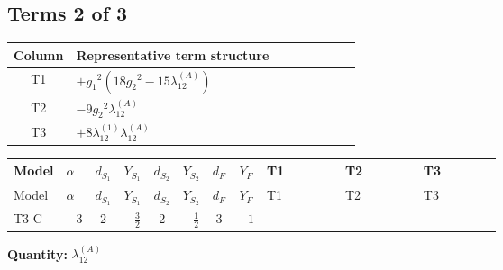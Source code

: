 \documentclass[8pt]{article}
\begin{document}
\begin{landscape}
\subsection*{Terms 2 of 3}
\begin{center}
\begin{tabular}{@{}c >{\raggedright\arraybackslash}p{0.82\linewidth}@{}}
\toprule
Column & Representative term structure \\
\midrule
T1 & \(\displaystyle +{g_1}^2 \left(18 {g_2}^2-15 {\lambda_{12}^{(A)}}\right)\) \\
\midrule
T2 & \(\displaystyle -9 {g_2}^2 {\lambda_{12}^{(A)}}\) \\
\midrule
T3 & \(\displaystyle +8 {\lambda_{12}^{(1)}} {\lambda_{12}^{(A)}}\) \\
\midrule
\bottomrule
\end{tabular}
\end{center}
\smallskip
\tiny
\begin{longtable}{@{}llcccccc >{\raggedright\arraybackslash}p{0.21\linewidth} >{\raggedright\arraybackslash}p{0.21\linewidth} >{\raggedright\arraybackslash}p{0.21\linewidth}@{}}
\toprule
Model & $\alpha$ & $d_{S_1}$ & $Y_{S_1}$ & $d_{S_2}$ & $Y_{S_2}$ & $d_F$ & $Y_F$ & T1 & T2 & T3 \\
\midrule
\endfirsthead
\toprule
Model & $\alpha$ & $d_{S_1}$ & $Y_{S_1}$ & $d_{S_2}$ & $Y_{S_2}$ & $d_F$ & $Y_F$ & T1 & T2 & T3 \\
\midrule
\endhead
T3-C & $-3$ & $2$ & $-\frac{3}{2}$ & $2$ & $-\frac{1}{2}$ & $3$ & $-1$ & \scriptsize\adjustbox{max width=\linewidth}{$\begin{gathered} +{g_1}^2 \left(18 {g_2}^2-15 {\lambda_{12}^{(A)}}\right)\end{gathered}$} & \scriptsize\adjustbox{max width=\linewidth}{$\begin{gathered} -9 {g_2}^2 {\lambda_{12}^{(A)}}\end{gathered}$} & \scriptsize\adjustbox{max width=\linewidth}{$\begin{gathered} +8 {\lambda_{12}^{(1)}} {\lambda_{12}^{(A)}}\end{gathered}$} \\
\midrule
\bottomrule
\end{longtable}
\clearpage
\noindent\textbf{Quantity: }$\lambda_{12}^{(A)}$\par\smallskip

\end{landscape}
\end{document}
